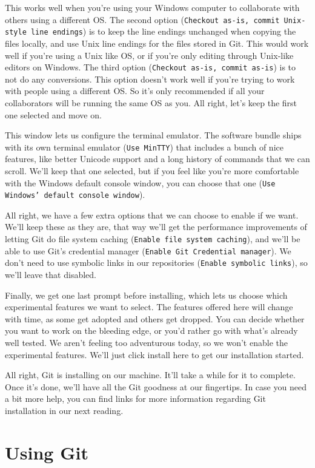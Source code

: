 	This works well when you're using your Windows computer to collaborate with others using a different OS. The second option (\texttt{Checkout as-is, commit Unix-style line endings}) is to keep the line endings unchanged when copying the files locally, and use Unix line endings for the files stored in Git. This would work well if you're using a Unix like OS, or if you're only editing through Unix-like editors on Windows. The third option (\texttt{Checkout as-is, commit as-is}) is to not do any conversions. This option doesn't work well if you're trying to work with people using a different OS. So it's only recommended if all your collaborators will be running the same OS as you. All right, let's keep the first one selected and move on.
	
	This window lets us configure the terminal emulator. The software bundle ships with its own terminal emulator (\texttt{Use MinTTY}) that includes a bunch of nice features, like better Unicode support and a long history of commands that we can scroll. We'll keep that one selected, but if you feel like you're more comfortable with the Windows default console window, you can choose that one (\texttt{Use Windows' default console window}).
	
	All right, we have a few extra options that we can choose to enable if we want. We'll keep these as they are, that way we'll get the performance improvements of letting Git do file system caching (\texttt{Enable file system caching}), and we'll be able to use Git's credential manager (\texttt{Enable Git Credential manager}). We don't need to use symbolic links in our repositories (\texttt{Enable symbolic links}), so we'll leave that disabled.
	
	Finally, we get one last prompt before installing, which lets us choose which experimental features we want to select. The features offered here will change with time, as some get adopted and others get dropped. You can decide whether you want to work on the bleeding edge, or you'd rather go with what's already well tested. We aren't feeling too adventurous today, so we won't enable the experimental features. We'll just click install here to get our installation started.
	
	All right, Git is installing on our machine. It'll take a while for it to complete. Once it's done, we'll have all the Git goodness at our fingertips. In case you need a bit more help, you can find links for more information regarding Git installation in our next reading.

\section{Using Git}

